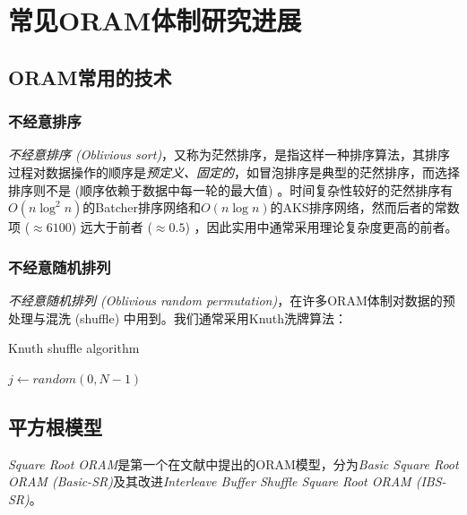 \section{常见ORAM体制研究进展}
\subsection{ORAM常用的技术}
\subsubsection{不经意排序}
\textit{不经意排序 (Oblivious sort)}，又称为茫然排序，是指这样一种排序算法，其排序过程对数据操作的顺序是\textit{预定义、固定的}，如冒泡排序是典型的茫然排序，而选择排序则不是 (顺序依赖于数据中每一轮的最大值) 。时间复杂性较好的茫然排序有$O(n\log^2{n})$的Batcher排序网络和$O(n\log{n})$的AKS排序网络，然而后者的常数项 ($\approx{6100}$) 远大于前者 ($\approx{0.5}$) ，因此实用中通常采用理论复杂度更高的前者。
\subsubsection{不经意随机排列}
\textit{不经意随机排列 (Oblivious random permutation)}，在许多ORAM体制对数据的预处理与混洗 (shuffle) 中用到。我们通常采用Knuth洗牌算法：
\begin{algorithm}[H]
    \label{alg:Knuth}
    \caption{Knuth shuffle algorithm}
    \begin{algorithmic}[1]
                \State $j \gets random(0,N-1)$
                \State {}
            \EndFor
		\EndProcedure
    \end{algorithmic}
\end{algorithm}

\subsection{平方根模型}
\textit{Square Root ORAM}是第一个在文献中提出的ORAM模型\cite{ref5}，分为\textit{Basic Square Root ORAM (Basic-SR)}及其改进\textit{Interleave Buffer Shuffle Square Root ORAM (IBS-SR)}。

